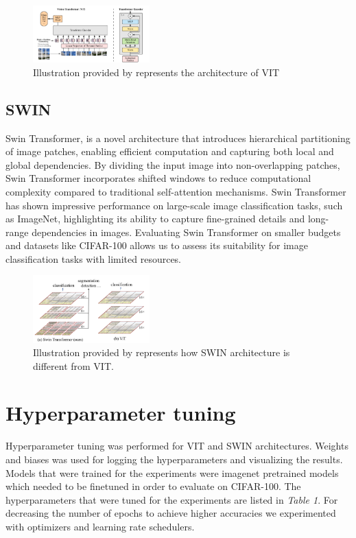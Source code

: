 \documentclass{article}
\begin{document}
\begin{figure}[ht]
    \vskip 0.2in
    \centering
    \includegraphics[width=0.4\textwidth]{vit.png}
    \caption{Illustration provided by \cite{DBLP:journals/corr/abs-2010-11929} represents the architecture of VIT}
    \label{fig:foobar}
    \vskip -0.2in
\end{figure}

\subsection{SWIN}
Swin Transformer, is a novel architecture that introduces hierarchical partitioning of image patches, enabling efficient computation and capturing both local and global dependencies. By dividing the input image into non-overlapping patches, Swin Transformer incorporates shifted windows to reduce computational complexity compared to traditional self-attention mechanisms. Swin Transformer has shown impressive performance on large-scale image classification tasks, such as ImageNet, highlighting its ability to capture fine-grained details and long-range dependencies in images. Evaluating Swin Transformer on smaller budgets and datasets like CIFAR-100 allows us to assess its suitability for image classification tasks with limited resources.

\begin{figure}[ht]
    \vskip 0.2in
    \centering
    \includegraphics[width=0.4\textwidth]{swin.png}
    \caption{Illustration provided by \cite{DBLP:journals/corr/abs-2103-14030} represents how SWIN architecture is different from VIT.}
    \label{fig:foobar}
    \vskip -0.2in
\end{figure}

\section{Hyperparameter tuning}
Hyperparameter tuning was performed for VIT and SWIN architectures.
Weights and biases \cite{wandb} was used for logging the hyperparameters and visualizing the results.
Models that were trained for the experiments were imagenet pretrained models which needed to be finetuned in order to evaluate on CIFAR-100.
The hyperparameters that were tuned for the experiments are listed in \textit{Table 1}.
For decreasing the number of epochs to achieve higher accuracies we experimented with optimizers and learning rate schedulers.
\end{document}
